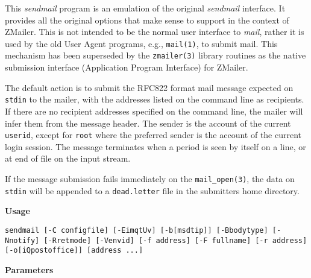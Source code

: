 
This {\em sendmail\/} program is an emulation of the original
{\em sendmail\/} interface. It provides all the original options
that make sense to support in the context of ZMailer.
This is not intended to be the normal user interface to
{\em mail\/}, rather it is used by the old User Agent programs, e.g.,
{\tt mail(1)}, to submit mail. This mechanism has been superseded
by the {\tt zmailer(3)} library routines as the native
submission interface (Application Program Interface) for ZMailer.

The default action is to submit the RFC822 format mail
message expected on {\tt stdin} to the mailer, with the
addresses listed on the command line as recipients. If
there are no recipient addresses specified on the command
line, the mailer will infer them from the message header.
The sender is the account of the current {\tt userid}, 
except for {\tt root} where the preferred sender is the 
account of the current login session. The message terminates 
when a period is seen by itself on a line, or at end of file on
the input stream.

If the message submission fails immediately on the
{\tt mail\_open(3)}, the data on {\tt stdin} will be 
appended to a {\tt dead.letter} file in the submitters home directory.

{\bf Usage}

{\tt sendmail [-C configfile] [-EimqtUv] [-b[msdtip]]
[-Bbodytype] [-Nnotify] [-Rretmode]
[-Venvid] [-f address] [-F fullname]
[-r address] [-o[i{\verbar}Qpostoffice]] [address ...]}

{\bf Parameters}

